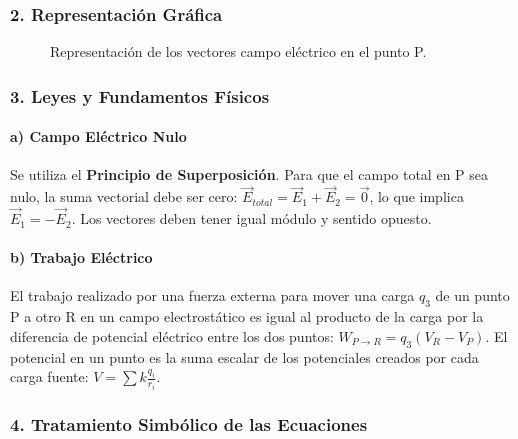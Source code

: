 \subsubsection*{2. Representación Gráfica}
\begin{figure}[H]
    \centering
    \caption{Representación de los vectores campo eléctrico en el punto P.}
\end{figure}

\subsubsection*{3. Leyes y Fundamentos Físicos}
\paragraph*{a) Campo Eléctrico Nulo}
Se utiliza el \textbf{Principio de Superposición}. Para que el campo total en P sea nulo, la suma vectorial debe ser cero: $\vec{E}_{total} = \vec{E}_1 + \vec{E}_2 = \vec{0}$, lo que implica $\vec{E}_1 = -\vec{E}_2$. Los vectores deben tener igual módulo y sentido opuesto.
\paragraph*{b) Trabajo Eléctrico}
El trabajo realizado por una fuerza externa para mover una carga $q_3$ de un punto P a otro R en un campo electrostático es igual al producto de la carga por la diferencia de potencial eléctrico entre los dos puntos: $W_{P \to R} = q_3 (V_R - V_P)$. El potencial en un punto es la suma escalar de los potenciales creados por cada carga fuente: $V = \sum k \frac{q_i}{r_i}$.

\subsubsection*{4. Tratamiento Simbólico de las Ecuaciones}
